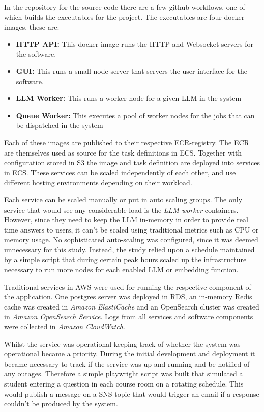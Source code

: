 


In the repository for the source code there are a few github workflows, one of which builds the executables for the project. The executables are four docker images, these are:


\begin{itemize}
        \item \textbf{HTTP API:} This docker image runs the HTTP and Websocket servers for the software.
        \item \textbf{GUI:} This runs a small node server that servers the user interface for the software.
        \item \textbf{LLM Worker:} This runs a worker node for a given \gls{LLM} in the system
        \item \textbf{Queue Worker:} This executes a pool of worker nodes for the jobs that can be dispatched in the system
\end{itemize}


Each of these images are published to their respective \gls{ECR}-registry. The \gls{ECR} are themselves used as source for the task definitions in \gls{ECS}. Together with configuration stored in \gls{S3} the image and task definition are deployed into services in \gls{ECS}. These services can be scaled independently of each other, and use different hosting environments depending on their workload.


Each service can be scaled manually or put in auto scaling groups. The only service that would see any considerable load is the \textit{LLM-worker} containers. However, since they need to keep the \gls{LLM} in-memory in order to provide real time answers to users, it can’t be scaled using traditional metrics such as CPU or memory usage. No sophisticated auto-scaling was configured, since it was deemed unnecessary for this study. Instead, the study relied upon a schedule maintained by a simple script that during certain peak hours scaled up the infrastructure necessary to run more nodes for each enabled \gls{LLM} or embedding function.


Traditional services in AWS were used for running the respective component of the application. One postgres server was deployed in \gls{RDS}, an in-memory Redis cache was created in \textit{Amazon ElastiCache} and an OpenSearch cluster was created in \textit{Amazon OpenSearch Service}. Logs from all services and software components were collected in \textit{Amazon CloudWatch}.


Whilst the service was operational keeping track of whether the system was operational became a priority. During the initial development and deployment it became necessary to track if the service was up and running and be notified of any outages. Therefore a simple playwright script was built that simulated a student entering a question in each course room on a rotating schedule. This would publish a message on a \gls{SNS} topic that would trigger an email if a response couldn’t be produced by the system.




